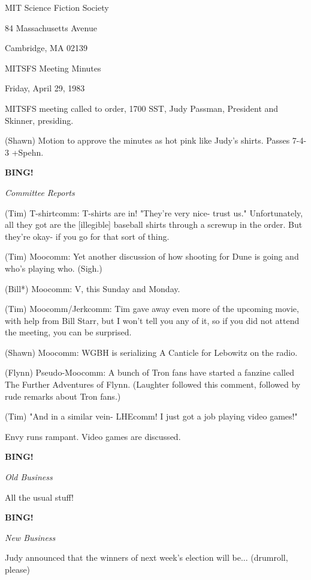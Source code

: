 \documentclass[12pt]{article}
\newcommand{\bing}{{\bf BING!} }
\newcommand{\goto}[1]{\bing \vskip 12pt \centerline{{\em{#1}}}}
\begin{document}
\begin{center}

MIT Science Fiction Society 

84 Massachusetts Avenue

Cambridge, MA 02139

\vspace{12pt}

MITSFS Meeting Minutes 

Friday, April 29, 1983

\end{center}
 
\vspace{18pt}

\setlength{\parskip}{6pt}

\noindent
MITSFS meeting called to order, 1700 SST,
Judy Passman, President and Skinner, presiding.

(Shawn) Motion to approve the minutes as hot pink like Judy's shirts. Passes 7-4-3 +Spehn.

\goto{Committee Reports}

(Tim) T-shirtcomm: T-shirts are in! "They're very nice- trust us." Unfortunately, all they got are the [illegible] baseball shirts through a screwup in the order. But they're okay- if you go for that sort of thing.

(Tim) Moocomm: Yet another discussion of how shooting for Dune is going and who's playing who. (Sigh.)

(Bill*) Moocomm: V, this Sunday and Monday.

(Tim) Moocomm/Jerkcomm: Tim gave away even more of the upcoming movie, with help from Bill Starr, but I won't tell you any of it, so if you did not attend the meeting, you can be surprised.

(Shawn) Moocomm: WGBH is serializing A Canticle for Lebowitz on the radio.

(Flynn) Pseudo-Moocomm: A bunch of Tron fans have started a fanzine called The Further Adventures of Flynn. (Laughter followed this comment, followed by rude remarks about Tron fans.)

(Tim) "And in a similar vein- LHEcomm! I just got a job playing video games!"

Envy runs rampant. Video games are discussed.

\goto{Old Business}

All the usual stuff!

\goto{New Business}

Judy announced that the winners of next week's election will be... (drumroll, please)
\end{document}
